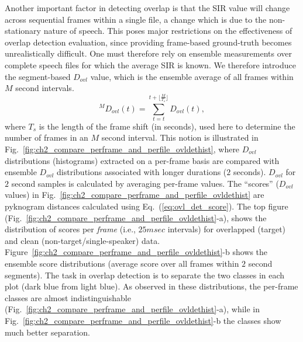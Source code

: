 {Another important factor in detecting overlap is that the SIR value will change across sequential frames within a single file, a change which is due to the non-stationary nature of speech. 
This poses major restrictions on the effectiveness of overlap detection evaluation, since providing frame-based ground-truth becomes unrealistically difficult. 
One must therefore rely on ensemble measurements over complete speech files for which the average SIR is known. 
We therefore introduce the segment-based $D_{ovl}$ value, which is the ensemble average of all frames within $M$ second intervals. 
\begin{equation}
\label{eq:seg_dovl}
^{M}D_{ovl}(t) = \sum_{t = t}^{t+\lfloor \frac{M}{T_s} \rfloor} D_{ovl}(t),
\end{equation}
where $T_s$ is the length of the frame shift (in seconds), used here to determine the number of frames in an $M$ second interval. 
This notion is illustrated in Fig.~\ref{fig:ch2_compare_perframe_and_perfile_ovldethist}, where $D_{ovl}$ distributions (histograms) extracted on a per-frame basis are compared with ensemble $D_{ovl}$ distributions associated with longer durations ($2$ seconds). 
$D_{ovl}$ for $2$ second samples is calculated by averaging per-frame values. 
The ``scores'' ($D_{ovl}$ values) in Fig.~\ref{fig:ch2_compare_perframe_and_perfile_ovldethist} are pyknogram distances calculated using Eq.~(\ref{eq:ovl_det_score}). 
The top figure (Fig.~\ref{fig:ch2_compare_perframe_and_perfile_ovldethist}-a), shows the distribution of scores per {\it frame} (i.e., $25msec$ intervals) for overlapped (target) and clean (non-target/single-speaker) data.  
Figure~\ref{fig:ch2_compare_perframe_and_perfile_ovldethist}-b shows the ensemble score distributions (average score over all frames within $2$ second segments). 
The task in overlap detection is to separate the two classes in each plot (dark blue from light blue). 
As observed in these distributions, the per-frame classes are almost indistinguishable (Fig.~\ref{fig:ch2_compare_perframe_and_perfile_ovldethist}-a), while in Fig.~\ref{fig:ch2_compare_perframe_and_perfile_ovldethist}-b the classes show much better separation. 


}
